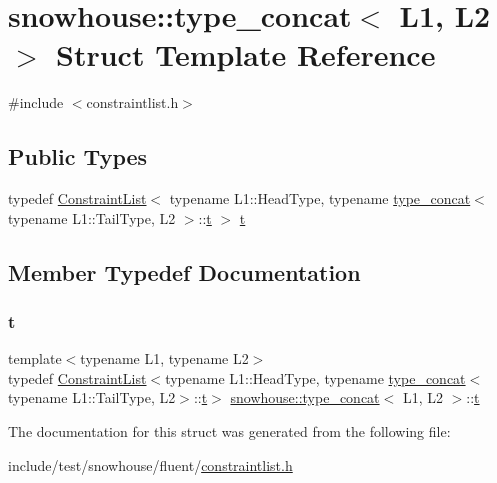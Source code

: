 \hypertarget{structsnowhouse_1_1type__concat}{}\section{snowhouse\+::type\+\_\+concat$<$ L1, L2 $>$ Struct Template Reference}
\label{structsnowhouse_1_1type__concat}


{\ttfamily \#include $<$constraintlist.\+h$>$}

\subsection*{Public Types}
\begin{DoxyCompactItemize}
\item 
typedef \mbox{\hyperlink{structsnowhouse_1_1ConstraintList}{Constraint\+List}}$<$ typename L1\+::\+Head\+Type, typename \mbox{\hyperlink{structsnowhouse_1_1type__concat}{type\+\_\+concat}}$<$ typename L1\+::\+Tail\+Type, L2 $>$\+::\mbox{\hyperlink{structsnowhouse_1_1type__concat_a53d7dd0bb352c73b6c29cb732f53910d}{t}} $>$ \mbox{\hyperlink{structsnowhouse_1_1type__concat_a53d7dd0bb352c73b6c29cb732f53910d}{t}}
\end{DoxyCompactItemize}


\subsection{Member Typedef Documentation}
\mbox{\label{structsnowhouse_1_1type__concat_a53d7dd0bb352c73b6c29cb732f53910d}} 
\subsubsection{\texorpdfstring{t}{t}}
{\footnotesize\ttfamily template$<$typename L1, typename L2$>$ \\
typedef \mbox{\hyperlink{structsnowhouse_1_1ConstraintList}{Constraint\+List}}$<$typename L1\+::\+Head\+Type, typename \mbox{\hyperlink{structsnowhouse_1_1type__concat}{type\+\_\+concat}}$<$typename L1\+::\+Tail\+Type, L2$>$\+::\mbox{\hyperlink{structsnowhouse_1_1type__concat_a53d7dd0bb352c73b6c29cb732f53910d}{t}}$>$ \mbox{\hyperlink{structsnowhouse_1_1type__concat}{snowhouse\+::type\+\_\+concat}}$<$ L1, L2 $>$\+::\mbox{\hyperlink{structsnowhouse_1_1type__concat_a53d7dd0bb352c73b6c29cb732f53910d}{t}}}



The documentation for this struct was generated from the following file\+:\begin{DoxyCompactItemize}
\item 
include/test/snowhouse/fluent/\mbox{\hyperlink{constraintlist_8h}{constraintlist.\+h}}\end{DoxyCompactItemize}

